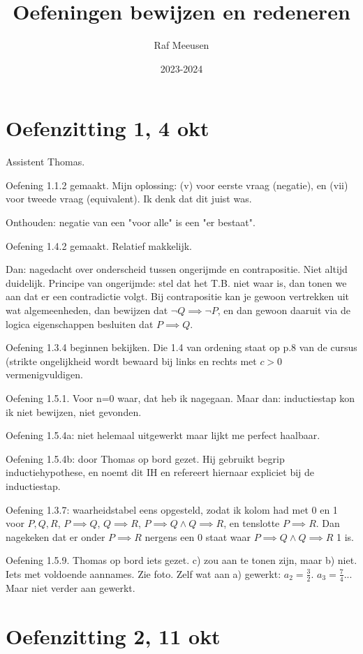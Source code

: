\documentclass{article}
\title{Oefeningen bewijzen en redeneren}
\author{Raf Meeusen}
\date{2023-2024}
\begin{document}
\maketitle

\section*{Oefenzitting 1, 4 okt}

Assistent Thomas. 

Oefening 1.1.2 gemaakt. Mijn oplossing: (v) voor eerste vraag (negatie), en (vii) voor tweede vraag (equivalent). Ik denk dat dit juist was. 

Onthouden: negatie van een "voor alle" is een "er bestaat". 

Oefening 1.4.2 gemaakt. Relatief makkelijk. 

Dan: nagedacht over onderscheid tussen ongerijmde en contrapositie. Niet altijd duidelijk. Principe van ongerijmde: stel dat het T.B. niet waar is, dan tonen we aan dat er een contradictie volgt. Bij contrapositie kan je gewoon vertrekken uit wat algemeenheden, dan bewijzen dat $\neg Q \implies \neg P$, en dan gewoon daaruit via de logica eigenschappen besluiten dat $P \implies Q$. 

Oefening 1.3.4 beginnen bekijken. Die 1.4 van ordening staat op p.8 van de cursus (strikte ongelijkheid wordt bewaard bij links en rechts met $c>0$ vermenigvuldigen. 

Oefening 1.5.1. Voor n=0 waar, dat heb ik nagegaan. Maar dan: inductiestap kon ik niet bewijzen, niet gevonden. 

Oefening 1.5.4a: niet helemaal uitgewerkt maar lijkt me perfect haalbaar. 

Oefening 1.5.4b: door Thomas op bord gezet. Hij gebruikt begrip inductiehypothese, en noemt dit IH en refereert hiernaar expliciet bij de inductiestap. 

Oefening 1.3.7: waarheidstabel eens opgesteld, zodat ik kolom had met 0 en 1 voor $P, Q, R$, $P \implies Q$, $Q \implies R$, $P \implies Q \land Q \implies R$, en tenslotte $P \implies R$. Dan nagekeken dat er onder  $P \implies R$ nergens een 0 staat waar $P \implies Q \land Q \implies R$ 1 is. 

Oefening 1.5.9. Thomas op bord iets gezet. c) zou aan te tonen zijn, maar b) niet. Iets met voldoende aannames. Zie foto. 
Zelf wat aan a) gewerkt: $a_2 = \frac{3}{2}$. $a_3 = \frac{7}{4}$... Maar niet verder aan gewerkt. 


\section*{Oefenzitting 2, 11 okt}
\end{document}

